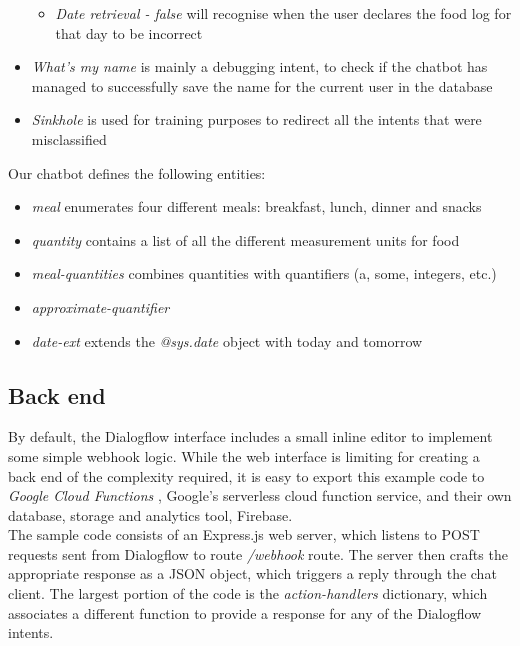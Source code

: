 \begin{itemize}
  \begin{itemize}
        \item \textit{Date retrieval - false} will recognise when the user declares the food log for that day to be incorrect
  \end{itemize}
  \item \textit{What's my name} is mainly a debugging intent, to check if the chatbot has managed to successfully save the name for the current user in the database
  \item \textit{Sinkhole} is used for training purposes to redirect all the intents that were misclassified
\end{itemize}
Our chatbot defines the following entities:
\begin{itemize}
  \item \textit{meal} enumerates four different meals: breakfast, lunch, dinner and snacks
  \item \textit{quantity} contains a list of all the different measurement units for food
  \item \textit{meal-quantities} combines quantities with quantifiers (a, some, integers, etc.)
  \item \textit{approximate-quantifier}
  \item \textit{date-ext} extends the \textit{@sys.date} object with today and tomorrow
\end{itemize}

\subsection{Back end}
By default, the Dialogflow interface includes a small inline editor to implement some simple webhook logic. While the web interface is limiting for creating a back end of the complexity required, it is easy to export this example code to \textit{Google Cloud Functions} \cite{gcfwebsite}, Google's serverless cloud function service, and their own database, storage and analytics tool, Firebase. \\
The sample code consists of an Express.js \cite{expresswebsite} web server, which listens to POST requests sent from Dialogflow to route \textit{/webhook} route. The server then crafts the appropriate response as a JSON object, which triggers a reply through the chat client. The largest portion of the code is the \textit{action-handlers} dictionary, which associates a different function to provide a response for any of the Dialogflow intents. 

